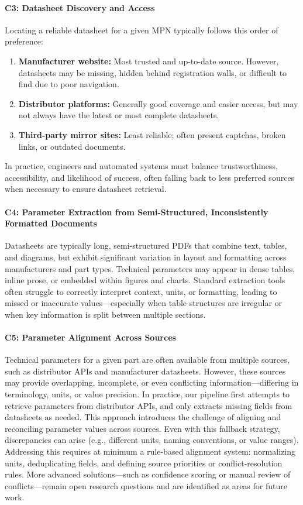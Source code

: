 \paragraph{C3: Datasheet Discovery and Access}
Locating a reliable datasheet for a given MPN typically follows this order of preference:
\begin{enumerate}
    \item \textbf{Manufacturer website:} Most trusted and up-to-date source. However, datasheets may be missing, hidden behind registration walls, or difficult to find due to poor navigation.
    \item \textbf{Distributor platforms:} Generally good coverage and easier access, but may not always have the latest or most complete datasheets.
    \item \textbf{Third-party mirror sites:} Least reliable; often present captchas, broken links, or outdated documents.
\end{enumerate}
In practice, engineers and automated systems must balance trustworthiness, accessibility, and likelihood of success, often falling back to less preferred sources when necessary to ensure datasheet retrieval.

\paragraph{C4: Parameter Extraction from Semi-Structured, Inconsistently Formatted Documents}
Datasheets are typically long, semi-structured PDFs that combine text, tables, and diagrams, but exhibit significant variation in layout and formatting across manufacturers and part types.
Technical parameters may appear in dense tables, inline prose, or embedded within figures and charts.
Standard extraction tools often struggle to correctly interpret context, units, or formatting, leading to missed or inaccurate values—especially when table structures are irregular or when key information is split between multiple sections.

\paragraph{C5: Parameter Alignment Across Sources}
Technical parameters for a given part are often available from multiple sources, such as distributor APIs and manufacturer datasheets. However, these sources may provide overlapping, incomplete, or even conflicting information—differing in terminology, units, or value precision. In practice, our pipeline first attempts to retrieve parameters from distributor APIs, and only extracts missing fields from datasheets as needed. This approach introduces the challenge of aligning and reconciling parameter values across sources. Even with this fallback strategy, discrepancies can arise (e.g., different units, naming conventions, or value ranges). Addressing this requires at minimum a rule-based alignment system: normalizing units, deduplicating fields, and defining source priorities or conflict-resolution rules. More advanced solutions—such as confidence scoring or manual review of conflicts—remain open research questions and are identified as areas for future work.

